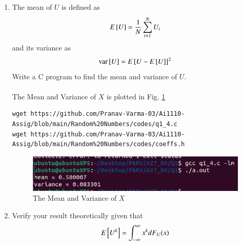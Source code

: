 \documentclass[journal,12pt,twocolumn]{IEEEtran}
\renewcommand\thesection{\arabic{section}}
\begin{document}
\begin{enumerate}[label=\textbf{\thesection.\arabic*}
,ref=\thesection.\theenumi]
\solution As we know \\
Probability density function of U:
\begin{equation}
     P_U(x) = 
    \begin{cases*}
        1 & for $x\in(0,1)$ \\
        0 & otherwise \\
    \end{cases*}
\end{equation}
\begin{align*}
    F_u(x) &= \int_{- \infty }^{x} \pr{U=a} da\\
     &= \int_{- \infty }^{0} (0) da + \int_{0}^{x} (1) da\\
     &= x
\end{align*}
\begin{equation}
    F_u(x) = 
    \begin{cases*}
    0 & for $x<0$\\
    $x$ & for $x \in (0,1)$\\
    1 & for $x>1$
    \end{cases*}
\end{equation}
%	
\item
The mean of $U$ is defined as
%
\begin{equation}
E{}\left[U\right] = \frac{1}{N}\sum_{i=1}^{N}U_i
\end{equation}
%
and its variance as
%
    \begin{equation}
        \text{var}{}\left[U\right] = E{}\left[U- E{}\left[U\right]\right]^2 
    \end{equation}
Write a C program to  find the mean and variance of $U$.\\ 
\solution\\
The Mean and Variance of $X$ is plotted in Fig. \ref{fig:mean_variance}
\begin{lstlisting}
wget https://github.com/Pranav-Varma-03/Ai1110-Assig/blob/main/Random%20Numbers/codes/q1_4.c
wget https://github.com/Pranav-Varma-03/Ai1110-Assig/blob/main/Random%20Numbers/codes/coeffs.h
\end{lstlisting}
\begin{figure}[!ht]
\centering
\includegraphics[width=\columnwidth]{figs/q1.png}
\caption{The Mean and Variance of $X$}
\label{fig:mean_variance}
\end{figure}
%
\item Verify your result theoretically given that
	\begin{equation}
        E{}\left[U^k\right] = \int_{-\infty}^{\infty}x^k dF_{U}(x)
    \end{equation}
    \end{enumerate}
\end{document}
